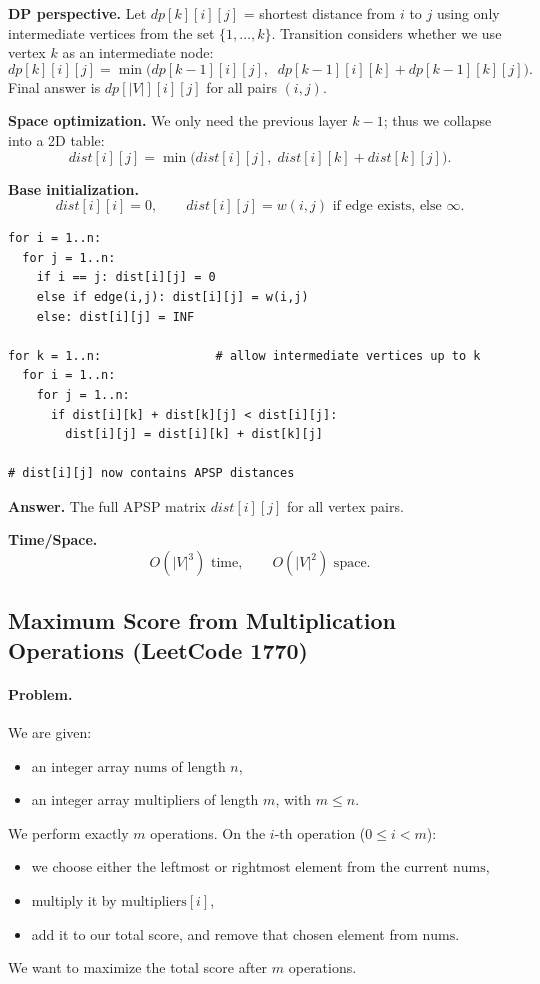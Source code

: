 \documentclass[9pt]{extarticle}
\begin{document}
\textbf{DP perspective.}  
Let \(dp[k][i][j]\) = shortest distance from \(i\) to \(j\) using only intermediate
vertices from the set \(\{1,\dots,k\}\).  
Transition considers whether we use vertex \(k\) as an intermediate node:
\[
dp[k][i][j] = \min\bigl(dp[k-1][i][j],\;\; dp[k-1][i][k] + dp[k-1][k][j]\bigr).
\]
Final answer is \(dp[|V|][i][j]\) for all pairs \((i,j)\).

\textbf{Space optimization.}  
We only need the previous layer \(k-1\); thus we collapse into a 2D table:
\[
dist[i][j] = \min\bigl(dist[i][j],\; dist[i][k] + dist[k][j]\bigr).
\]

\textbf{Base initialization.}
\[
dist[i][i] = 0,\qquad
dist[i][j] = w(i,j) \text{ if edge exists, else } \infty.
\]

\begin{verbatim}
for i = 1..n:
  for j = 1..n:
    if i == j: dist[i][j] = 0
    else if edge(i,j): dist[i][j] = w(i,j)
    else: dist[i][j] = INF

for k = 1..n:                # allow intermediate vertices up to k
  for i = 1..n:
    for j = 1..n:
      if dist[i][k] + dist[k][j] < dist[i][j]:
        dist[i][j] = dist[i][k] + dist[k][j]

# dist[i][j] now contains APSP distances
\end{verbatim}

\textbf{Answer.}  
The full APSP matrix \(dist[i][j]\) for all vertex pairs.

\textbf{Time/Space.}  
\[
O(|V|^3) \text{ time}, \qquad O(|V|^2) \text{ space}.
\]
\subsection{Maximum Score from Multiplication Operations (LeetCode 1770)}

\paragraph{Problem.}
We are given:
\begin{itemize}
    \item an integer array \(\text{nums}\) of length \(n\),
    \item an integer array \(\text{multipliers}\) of length \(m\), with \(m \le n\).
\end{itemize}
We perform exactly \(m\) operations. On the \(i\)-th operation (\(0 \le i < m\)):
\begin{itemize}
    \item we choose either the leftmost or rightmost element from the current \(\text{nums}\),
    \item multiply it by \(\text{multipliers}[i]\),
    \item add it to our total score, and remove that chosen element from \(\text{nums}\).
\end{itemize}
We want to maximize the total score after \(m\) operations.
\end{document}
